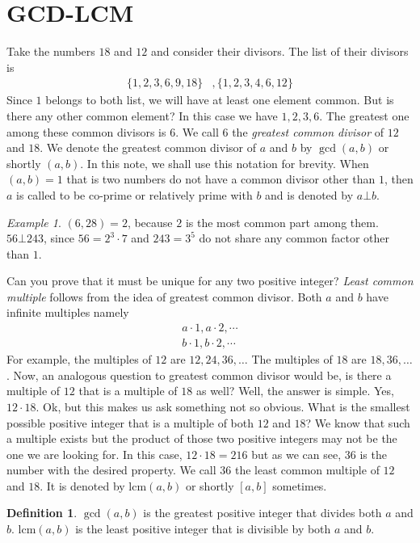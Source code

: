 \documentclass[a4paper, leqno]{article}
\theoremstyle{definition}
\newtheorem{definition}{Definition}
\theoremstyle{remark}
\newtheorem*{example}{Example}
\newcommand{\lcm}{\text{lcm}}
\begin{document}
	\section{GCD-LCM}
		Take the numbers $18$ and $12$ and consider their divisors. The list of their divisors is
			\begin{align*}
				\{1,2,3,6,9,18\} & , \{1,2,3,4,6,12\}
			\end{align*}
		Since $1$ belongs to both list, we will have at least one element common. But is there any other common element? In this case we have $1,2,3,6$. The greatest one among these common divisors is $6$. We call $6$ the \textit{greatest common divisor} of $12$ and $18$. We denote the greatest common divisor of $a$ and $b$ by $\gcd(a,b)$ or shortly $(a,b)$. In this note, we shall use this notation for brevity. When $(a,b) = 1$ that is two numbers do not have a common divisor other than $1$, then $a$ is called to be co-prime or relatively
		prime with $b$ and is denoted by $a \bot b$.
			\begin{example}
				$(6,28) = 2$, because $2$ is the most common part among them. $56\bot 243$, since $56=2^3\cdot7$ and $243=3^5$ do not share any common factor other than $1$.
			\end{example}
		Can you prove that it must be unique for any two positive integer? \textit{Least common multiple} follows from the idea of greatest common divisor. Both $a$ and $b$ have infinite multiples namely
			\begin{align*}
				a\cdot1,a\cdot2,\cdots\\
				b\cdot1,b\cdot2,\cdots
			\end{align*}
		For example, the multiples of $12$ are $12,24,36,\ldots$ The multiples of $18$ are $18,36,\ldots$. Now, an analogous question to greatest common divisor would be, is there a multiple of $12$ that is a multiple of $18$ as well? Well, the answer is simple. Yes, $12\cdot18$. Ok, but this makes us ask something not so obvious. What is the smallest possible positive integer that is a multiple of both $12$ and $18$? We know that such a multiple exists but the product of those two positive integers may not be the one we are looking for. In this case, $12\cdot18=216$ but as we can see, $36$ is the number with the desired property. We call $36$ the least common multiple of $12$ and $18$. It is denoted by $\lcm(a,b)$ or shortly $[a,b]$ sometimes.
			\begin{definition}
				$\gcd(a,b)$ is the greatest positive integer that divides both $a$ and $b$. $\lcm(a,b)$ is the least positive integer that is divisible by both $a$ and $b$.
			\end{definition}
			
\end{document}
